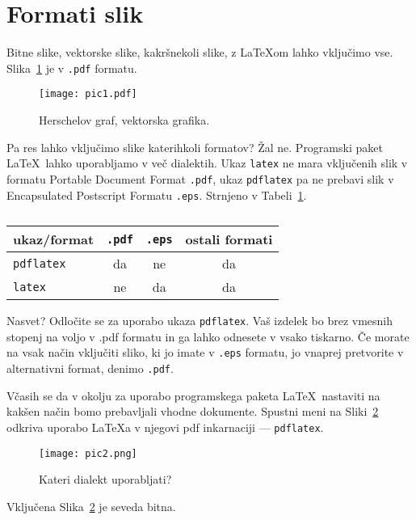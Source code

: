 \section{Formati slik}
Bitne slike, vektorske slike, kakršnekoli slike, z \LaTeX{}om lahko vključimo vse.
Slika~\ref{pic1} je v {\tt .pdf} formatu.
\begin{figure}
    \begin{center}
        \texttt{[image: pic1.pdf]}
    \end{center}
\caption{Herschelov graf, vektorska grafika.}
\label{pic1}
\end{figure}
Pa res lahko vključimo slike katerihkoli formatov? Žal ne. Programski paket \LaTeX\ lahko uporabljamo v več dialektih. Ukaz {\tt latex} ne mara vključenih slik v formatu Portable Document Format {\tt .pdf}, ukaz {\tt pdflatex} pa ne prebavi slik v Encapsulated Postscript Formatu {\tt .eps}.
Strnjeno v Tabeli~\ref{tbl:1}.

\begin{table}
    \begin{center}
        \begin{tabular}{l|ccc}
            ukaz/format & {\tt .pdf} & {\tt .eps} & ostali formati \\ \hline
                        {\tt pdflatex} & da & ne & da \\
                        {\tt latex}   & ne & da  & da
        \end{tabular}
    \end{center}
\caption{}
\label{tbl:1}
\end{table}

Nasvet? Odločite se za uporabo ukaza {\tt pdflatex}. Vaš izdelek bo brez vmesnih stopenj na voljo v {.pdf} formatu in ga lahko odnesete v vsako tiskarno. Če morate na vsak način vključiti sliko, ki jo imate v {\tt .eps} formatu, jo vnaprej pretvorite v alternativni format, denimo {\tt .pdf}.

Včasih se da v okolju za uporabo programskega paketa \LaTeX\ nastaviti na kakšen način bomo prebavljali vhodne dokumente. Spustni meni na Sliki~\ref{pic2} odkriva uporabo \LaTeX{}a v njegovi pdf inkarnaciji --- {\tt pdflatex}.
\begin{figure}
\begin{center}
\texttt{[image: pic2.png]}
\end{center}
\caption{Kateri dialekt uporabljati?}
\label{pic2}
\end{figure}

Vključena Slika~\ref{pic2} je seveda bitna.

